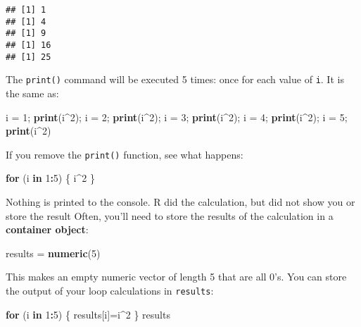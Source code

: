 \documentclass[]{book}
\newenvironment{Shaded}{\begin{snugshade}}{\end{snugshade}}
\newcommand{\KeywordTok}[1]{\textcolor[rgb]{0.13,0.29,0.53}{\textbf{#1}}}
\newcommand{\DecValTok}[1]{\textcolor[rgb]{0.00,0.00,0.81}{#1}}
\newcommand{\StringTok}[1]{\textcolor[rgb]{0.31,0.60,0.02}{#1}}
\newcommand{\ControlFlowTok}[1]{\textcolor[rgb]{0.13,0.29,0.53}{\textbf{#1}}}
\newcommand{\OperatorTok}[1]{\textcolor[rgb]{0.81,0.36,0.00}{\textbf{#1}}}
\newcommand{\NormalTok}[1]{#1}
\theoremstyle{definition}
\theoremstyle{definition}
\theoremstyle{definition}
\theoremstyle{remark}
\begin{document}
\begin{verbatim}
## [1] 1
## [1] 4
## [1] 9
## [1] 16
## [1] 25
\end{verbatim}

The \texttt{print()} command will be executed 5 times: once for each
value of \texttt{i}. It is the same as:

\begin{Shaded}
\begin{Highlighting}[]
\NormalTok{i =}\StringTok{ }\DecValTok{1}\NormalTok{; }\KeywordTok{print}\NormalTok{(i}\OperatorTok{^}\DecValTok{2}\NormalTok{); i =}\StringTok{ }\DecValTok{2}\NormalTok{; }\KeywordTok{print}\NormalTok{(i}\OperatorTok{^}\DecValTok{2}\NormalTok{); i =}\StringTok{ }\DecValTok{3}\NormalTok{; }\KeywordTok{print}\NormalTok{(i}\OperatorTok{^}\DecValTok{2}\NormalTok{); i =}\StringTok{ }\DecValTok{4}\NormalTok{; }\KeywordTok{print}\NormalTok{(i}\OperatorTok{^}\DecValTok{2}\NormalTok{); i =}\StringTok{ }\DecValTok{5}\NormalTok{; }\KeywordTok{print}\NormalTok{(i}\OperatorTok{^}\DecValTok{2}\NormalTok{)}
\end{Highlighting}
\end{Shaded}

If you remove the \texttt{print()} function, see what happens:

\begin{Shaded}
\begin{Highlighting}[]
\ControlFlowTok{for}\NormalTok{ (i }\ControlFlowTok{in} \DecValTok{1}\OperatorTok{:}\DecValTok{5}\NormalTok{) \{}
\NormalTok{  i}\OperatorTok{^}\DecValTok{2}
\NormalTok{\}}
\end{Highlighting}
\end{Shaded}

Nothing is printed to the console. R did the calculation, but did not
show you or store the result Often, you'll need to store the results of
the calculation in a \textbf{container object}:

\begin{Shaded}
\begin{Highlighting}[]
\NormalTok{results =}\StringTok{ }\KeywordTok{numeric}\NormalTok{(}\DecValTok{5}\NormalTok{)}
\end{Highlighting}
\end{Shaded}

This makes an empty numeric vector of length 5 that are all 0's. You can
store the output of your loop calculations in \texttt{results}:

\begin{Shaded}
\begin{Highlighting}[]
\ControlFlowTok{for}\NormalTok{ (i }\ControlFlowTok{in} \DecValTok{1}\OperatorTok{:}\DecValTok{5}\NormalTok{) \{}
\NormalTok{  results[i]=i}\OperatorTok{^}\DecValTok{2}
\NormalTok{\}}
\NormalTok{results}
\end{Highlighting}
\end{Shaded}
\end{document}
